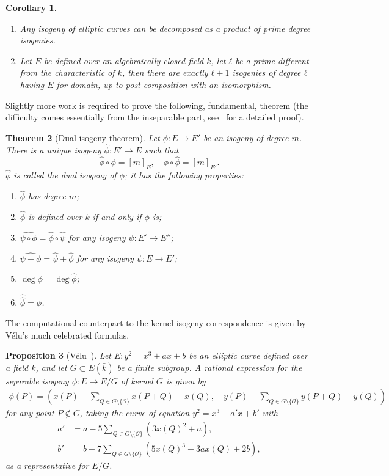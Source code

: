\documentclass[10pt]{article}
\theoremstyle{plain}
\newtheorem{theorem}{Theorem}
\newtheorem{corollary}[theorem]{Corollary}
\newtheorem{proposition}[theorem]{Proposition}
\theoremstyle{definition}
\def\O{\ensuremath{\mathcal{O}}}
\begin{document}
\begin{corollary}\ 
  \label{coro:isog-basic}
  \begin{enumerate}
  \item Any isogeny of elliptic curves can be decomposed as a product
    of prime degree isogenies.
  \item Let $E$ be defined over an algebraically closed field $k$, let
    $ℓ$ be a prime different from the characteristic of $k$, then
    there are exactly $ℓ+1$ isogenies of degree $ℓ$ having $E$ for domain,
    up to post-composition with an isomorphism.
  \end{enumerate}
\end{corollary}

Slightly more work is required to prove the following, fundamental,
theorem (the difficulty comes essentially from the inseparable part,
see~\cite[III.6.1]{silverman:elliptic} for a detailed proof).

\begin{theorem}[Dual isogeny theorem]
  Let $ϕ:E→ E'$ be an isogeny of degree $m$. %
  There is a unique isogeny $\hat{ϕ}:E'→ E$ such that
  \[\hat{ϕ}∘ϕ = [m]_E, \quad ϕ∘\hat{ϕ} = [m]_{E'}.\] %
  $\hat{ϕ}$ is called the \emph{dual isogeny of $ϕ$}; it has the
  following properties:
  
  \begin{enumerate}
  \item $\hat{ϕ}$ has degree $m$;
  \item $\hat{ϕ}$ is defined over $k$ if and only if $ϕ$ is;
  \item $\widehat{ψ∘ϕ} = \hat{ϕ}∘\hat{ψ}$ for any isogeny $ψ:E'→ E''$;
  \item $\widehat{ψ+ϕ} = \hat{ψ} + \hat{ϕ}$ for any isogeny $ψ:E→ E'$;
  \item $\deg ϕ = \deg\hat{ϕ}$;
  \item $\hat{\hat{ϕ}} = ϕ$.
  \end{enumerate}
\end{theorem}

The computational counterpart to the kernel-isogeny correspondence is
given by Vélu's much celebrated formulas. %

\begin{proposition}[{Vélu~\cite{velu71}}]
  \label{th:velu}
  Let $E:y^2=x^3+ax+b$ be an elliptic curve defined over a field $k$,
  and let $G⊂E(\bar{k})$ be a finite subgroup. %
  A rational expression for the separable isogeny $ϕ:E→ E/G$ of kernel
  $G$ is given by
  \begin{align*}
    ϕ(P) = \left(
      x(P) + \sum_{Q∈G\setminus\{\O\}}x(P+Q)-x(Q),\quad
      y(P) + \sum_{Q∈G\setminus\{\O\}}y(P+Q)-y(Q)
    \right)
  \end{align*} %
  for any point $P ∉ G$, taking the curve of equation $y^2=x^3+a'x+b'$
  with
  \begin{align*}
    a' &= a - 5\sum_{Q∈G\setminus\{\O\}}(3x(Q)^2+a),\\
    b' &= b - 7\sum_{Q∈G\setminus\{\O\}}(5x(Q)^3+3ax(Q)+2b),
  \end{align*}
  as a representative for $E/G$.
\end{proposition}
\end{document}
